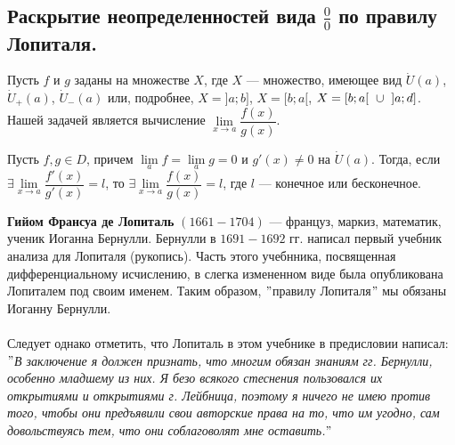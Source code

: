 	\subsection{Раскрытие неопределенностей вида $\frac{0}{0}$ по правилу Лопиталя.}
	Пусть $f$ и $g$ заданы на множестве $X$, где $X$ --- множество, имеющее вид $\Dot{U}(a)$, $\Dot{U}_+(a)$, $\Dot{U}_-(a)$ или, подробнее, $X = ]a; b]$, $X = [b; a[$, $X = [b; a[ \hspace{0,2 cm} \cup \hspace{0,2 cm} ]a; d]$. Нашей задачей является вычисление $\lim\limits_{x \rightarrow a}{\dfrac{f(x)}{g(x)}}$.
	\begin{theorem}
		Пусть $f, g \in D$, причем $\lim\limits_{a}{f} = \lim\limits_{a}{g} = 0$ и
		$g'(x) \neq 0$ на $\Dot{U}(a)$. Тогда, если $\exists \lim\limits_{x \rightarrow a}{\dfrac{f'(x)}{g'(x)}} = l$, то $\exists \lim\limits_{x \rightarrow a}{\dfrac{f(x)}{g(x)}} = l$, где $l$ --- конечное или бесконечное. 
	\end{theorem}
	\textbf{Гийом Франсуа де Лопиталь} $(1661 - 1704)$ --- француз, маркиз, математик, ученик Иоганна Бернулли. Бернулли в $1691 - 1692$ гг. написал первый учебник анализа для Лопиталя (рукопись). Часть этого учебнника, посвященная дифференциальному исчислению, в слегка измененном виде была опубликована Лопиталем под своим именем. Таким образом, $"$правилу Лопиталя$"$ мы обязаны Иоганну Бернулли.\\\\ Следует однако отметить, что Лопиталь в этом учебнике в предисловии написал: 
	\textit{$"$В заключение я должен признать, что многим обязан знаниям гг. Бернулли, особенно младшему из них. Я безо всякого стеснения пользовался их открытиями и открытиями г. Лейбница, поэтому я ничего не имею против того, чтобы они предъявили свои авторские права на то, что им угодно, сам довольствуясь тем, что они соблаговолят мне оставить.$"$}\\\\
